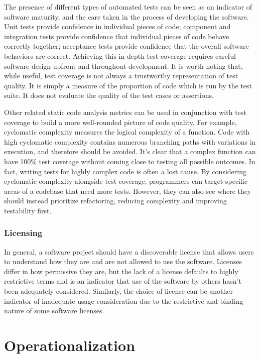 \documentclass{article}
\begin{document}
The presence of different types of automated tests can be seen as an indicator of software maturity, and the care taken in the process of developing the software. Unit tests provide confidence in individual pieces of code; component and integration tests provide confidence that individual pieces of code behave correctly together; acceptance tests provide confidence that the overall software behaviors are correct. Achieving this in-depth test coverage requires careful software design upfront and throughout development. It is worth noting that, while useful, test coverage is not always a trustworthy representation of test quality. It is simply a measure of the proportion of code which is run by the test suite. It does not evaluate the quality of the test cases or assertions.

Other related static code analysis metrics can be used in conjunction with test coverage to build a more well-rounded picture of code quality. For example, cyclomatic complexity measures the logical complexity of a function. Code with high cyclomatic complexity contains numerous branching paths with variations in execution, and therefore should be avoided. It’s clear that a complex function can have 100\% test coverage without coming close to testing all possible outcomes. In fact, writing tests for highly complex code is often a lost cause. By considering cyclomatic complexity alongside test coverage, programmers can target specific areas of a codebase that need more tests. However, they can also see where they should instead prioritize refactoring, reducing complexity and improving testability first.

\subsubsection{Licensing}
In general, a software project should have a discoverable license that allows users to understand how they are and are not allowed to use the software. Licenses differ in how permissive they are, but the lack of a license defaults to highly restrictive terms and is an indicator that use of the software by others hasn’t been adequately considered. Similarly, the choice of license can be another indicator of inadequate usage consideration due to the restrictive and binding nature of some software licenses. 



\section{Operationalization}
\end{document}
